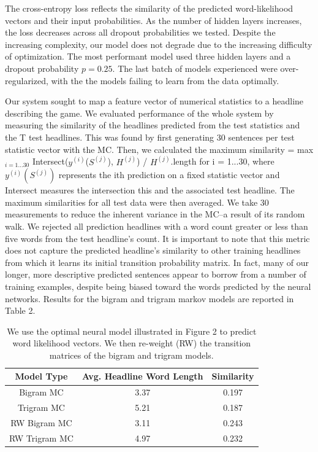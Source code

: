 \documentclass[12pt, journal]{IEEEtran}
\begin{document}
The cross-entropy loss reflects the similarity of the predicted word-likelihood vectors and their input probabilities. As the number of hidden layers increases, the loss decreases across all dropout probabilities we tested. Despite the increasing complexity, our model does not degrade due to the increasing difficulty of optimization. The most performant model used three hidden layers and a dropout probability $p = 0.25$. The last batch of models experienced were over-regularized, with the the models failing to learn from the data optimally. 

Our system sought to map a feature vector of numerical statistics to a headline describing the game. We evaluated performance of the whole system by measuring the similarity of the headlines predicted from the test statistics and the T test headlines. This was found by first generating 30 sentences per test statistic vector with the MC. Then, we calculated the maximum similarity = max$_{i=1...30}$ Intersect($y^{(i)}$($S^{(j)}$), $H^{(j)}$) / $H^{(j)}$.length for i = 1...30, where $y^{(i)}(S^{(j)})$ represents the ith prediction on a fixed statistic vector and Intersect measures the intersection this and the associated test headline. The maximum similarities for all test data were then averaged. We take 30 measurements to reduce the inherent variance in the MC--a result of its random walk. We rejected all prediction headlines with a word count greater or less than five words from the test headline's count. It is important to note that this metric does not capture the predicted headline's similarity to other training headlines from which it learns its initial transition probability matrix. In fact, many of our longer, more descriptive predicted sentences appear to borrow from a number of training examples, despite being biased toward the words predicted by the neural networks. Results for the bigram and trigram markov models are reported in Table 2. 

\begin{table}[!t]
\renewcommand{\arraystretch}{1.3}
\caption{We use the optimal neural model illustrated in Figure 2 to predict word likelihood vectors. We then re-weight (RW) the transition matrices of the bigram and trigram models.}
\label{table_example}
\centering
\begin{tabular}{|c||c||c|}
\hline
Model Type & Avg. Headline Word Length & Similarity \\
\hline
Bigram MC & 3.37 & 0.197\\
Trigram MC & 5.21 & 0.187\\
RW Bigram MC & 3.11 & 0.243\\
RW Trigram MC & 4.97 &  0.232\\

\hline
\end{tabular}
\end{table}
\end{document}

